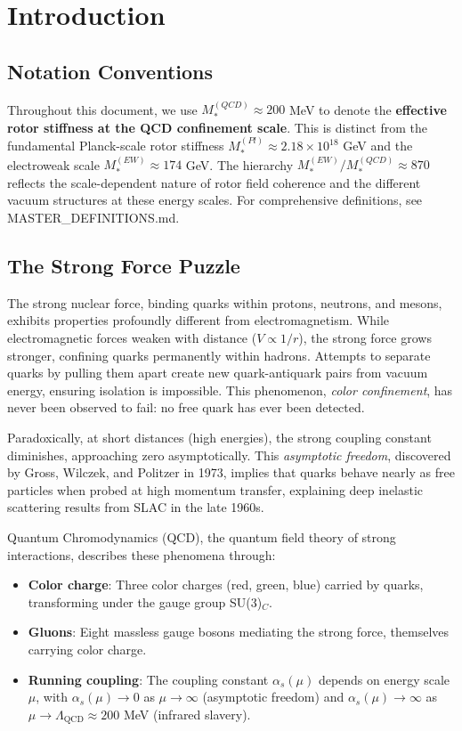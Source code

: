\documentclass[11pt,a4paper]{article}
\theoremstyle{definition}
\theoremstyle{plain}
\theoremstyle{remark}
\begin{document}
\section{Introduction}
\label{sec:introduction}

\subsection{Notation Conventions}

Throughout this document, we use $M_*^{(QCD)} \approx 200$ MeV to denote the \textbf{effective rotor stiffness at the QCD confinement scale}. This is distinct from the fundamental Planck-scale rotor stiffness $M_*^{(Pl)} \approx 2.18 \times 10^{18}$ GeV and the electroweak scale $M_*^{(EW)} \approx 174$ GeV. The hierarchy $M_*^{(EW)}/M_*^{(QCD)} \approx 870$ reflects the scale-dependent nature of rotor field coherence and the different vacuum structures at these energy scales. For comprehensive definitions, see MASTER\_DEFINITIONS.md.

\subsection{The Strong Force Puzzle}

The strong nuclear force, binding quarks within protons, neutrons, and mesons, exhibits properties profoundly different from electromagnetism. While electromagnetic forces weaken with distance ($V \propto 1/r$), the strong force grows stronger, confining quarks permanently within hadrons. Attempts to separate quarks by pulling them apart create new quark-antiquark pairs from vacuum energy, ensuring isolation is impossible. This phenomenon, \emph{color confinement}, has never been observed to fail: no free quark has ever been detected.

Paradoxically, at short distances (high energies), the strong coupling constant diminishes, approaching zero asymptotically. This \emph{asymptotic freedom}, discovered by Gross, Wilczek, and Politzer in 1973, implies that quarks behave nearly as free particles when probed at high momentum transfer, explaining deep inelastic scattering results from SLAC in the late 1960s.

Quantum Chromodynamics (QCD), the quantum field theory of strong interactions, describes these phenomena through:
\begin{itemize}[leftmargin=*,itemsep=3pt]
  \item \textbf{Color charge}: Three color charges (red, green, blue) carried by quarks, transforming under the gauge group SU(3)$_C$.
  \item \textbf{Gluons}: Eight massless gauge bosons mediating the strong force, themselves carrying color charge.
  \item \textbf{Running coupling}: The coupling constant $\alpha_s(\mu)$ depends on energy scale $\mu$, with $\alpha_s(\mu) \to 0$ as $\mu \to \infty$ (asymptotic freedom) and $\alpha_s(\mu) \to \infty$ as $\mu \to \Lambda_{\mathrm{QCD}} \approx 200$ MeV (infrared slavery).
\end{itemize}
\end{document}
